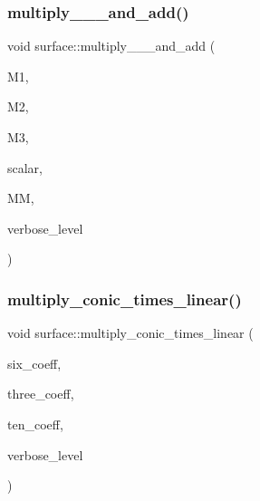 \mbox{\label{classsurface_ae55d550aa63616f48c1b6348ae0fdfab}} 
\subsubsection{\texorpdfstring{multiply\+\_\+\_\+\_\+and\+\_\+add()}{multiply\_222\_27\_and\_add()}}
{\footnotesize\ttfamily void surface\+::multiply\+\_\+\_\+\_\+and\+\_\+add (\begin{DoxyParamCaption}\item[{\mbox{\hyperlink{galois_8h_a09fddde158a3a20bd2dcadb609de11dc}{I\+NT}} $\ast$}]{M1,  }\item[{\mbox{\hyperlink{galois_8h_a09fddde158a3a20bd2dcadb609de11dc}{I\+NT}} $\ast$}]{M2,  }\item[{\mbox{\hyperlink{galois_8h_a09fddde158a3a20bd2dcadb609de11dc}{I\+NT}} $\ast$}]{M3,  }\item[{\mbox{\hyperlink{galois_8h_a09fddde158a3a20bd2dcadb609de11dc}{I\+NT}}}]{scalar,  }\item[{\mbox{\hyperlink{galois_8h_a09fddde158a3a20bd2dcadb609de11dc}{I\+NT}} $\ast$}]{MM,  }\item[{\mbox{\hyperlink{galois_8h_a09fddde158a3a20bd2dcadb609de11dc}{I\+NT}}}]{verbose\+\_\+level }\end{DoxyParamCaption})}

\mbox{\label{classsurface_a916614262f53278058e7108aeaf145dc}} 
\subsubsection{\texorpdfstring{multiply\+\_\+conic\+\_\+times\+\_\+linear()}{multiply\_conic\_times\_linear()}}
{\footnotesize\ttfamily void surface\+::multiply\+\_\+conic\+\_\+times\+\_\+linear (\begin{DoxyParamCaption}\item[{\mbox{\hyperlink{galois_8h_a09fddde158a3a20bd2dcadb609de11dc}{I\+NT}} $\ast$}]{six\+\_\+coeff,  }\item[{\mbox{\hyperlink{galois_8h_a09fddde158a3a20bd2dcadb609de11dc}{I\+NT}} $\ast$}]{three\+\_\+coeff,  }\item[{\mbox{\hyperlink{galois_8h_a09fddde158a3a20bd2dcadb609de11dc}{I\+NT}} $\ast$}]{ten\+\_\+coeff,  }\item[{\mbox{\hyperlink{galois_8h_a09fddde158a3a20bd2dcadb609de11dc}{I\+NT}}}]{verbose\+\_\+level }\end{DoxyParamCaption})}

